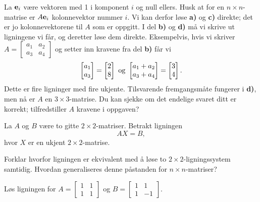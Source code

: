 



\begin{losning}
La $\mathbf{e}_i$ være vektoren med 1 i komponent $i$ og null ellers. Husk at for en $n\times n$-matrise er $A\mathbf{e}_i$ kolonnevektor nummer $i$. Vi kan derfor løse \textbf{a)} og \textbf{c)} direkte; det er jo kolonnevektorene til $A$ som er oppgitt. I del \textbf{b)} og \textbf{d)} må vi skrive ut ligningene vi får, og deretter løse dem direkte. Eksempelvis, hvis vi skriver $A=\begin{bmatrix}
a_1 & a_2\\
a_3 & a_4
\end{bmatrix}
$ og setter inn kravene fra del \textbf{b)} får vi $$\begin{bmatrix} a_1 \\ a_3 \end{bmatrix}=\begin{bmatrix} 2 \\ 8 \end{bmatrix} \text{ og } \begin{bmatrix} a_1+a_2 \\ a_3+a_4 \end{bmatrix}=\begin{bmatrix} 3 \\ 4 \end{bmatrix}.$$ Dette er fire ligninger med fire ukjente. Tilsvarende fremgangsmåte fungerer i \textbf{d)}, men nå er $A$ en $3\times 3$-matrise. Du kan sjekke om det endelige svaret ditt er korrekt; tilfredstiller $A$ kravene i oppgaven?
\end{losning}




\begin{oppgave}
La $A$ og $B$ være to gitte $2\times 2$-matriser. Betrakt ligningen $$AX=B,$$ hvor $X$ er en ukjent $2\times 2$-matrise.

\begin{punkt}
Forklar hvorfor ligningen er ekvivalent med å løse to $2\times 2$-ligningssystem samtidig. Hvordan generaliseres denne påstanden for $n\times n$-matriser?
\end{punkt}

\begin{punkt}
Løs ligningen for $A=\begin{bmatrix}
1 & 1\\
1 & 1
\end{bmatrix}
$ og $B=\begin{bmatrix}
1 & 1\\
1 & -1
\end{bmatrix}.$
\end{punkt}


\end{oppgave}



